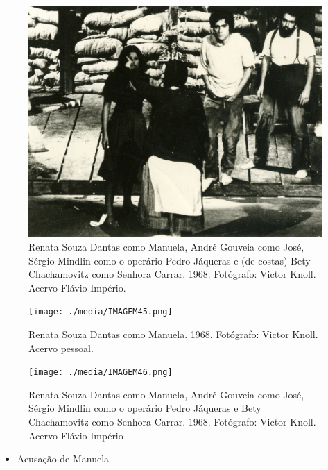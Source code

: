 \begin{figure}
\includegraphics[width=\columnwidth]{./media/IMAGEM44.png}
\caption{Renata Souza Dantas como Manuela, André Gouveia como José, Sérgio
Mindlin como o operário Pedro Jáqueras e (de costas) Bety Chachamovitz
como Senhora Carrar. 1968. Fotógrafo: Victor Knoll. Acervo Flávio Império.}
\end{figure}



\begin{figure}
\texttt{[image: ./media/IMAGEM45.png]}
\caption{Renata Souza Dantas como Manuela. 1968. Fotógrafo: Victor Knoll. Acervo
pessoal.}
\end{figure}


\begin{figure}
\texttt{[image: ./media/IMAGEM46.png]}
\caption{Renata Souza Dantas como Manuela, André Gouveia como José, Sérgio
Mindlin como o operário Pedro Jáqueras e Bety Chachamovitz como Senhora
Carrar. 1968. Fotógrafo: Victor Knoll. Acervo Flávio Império}
\end{figure}


\begin{itemize}
\item Acusação de Manuela
\end{itemize}

